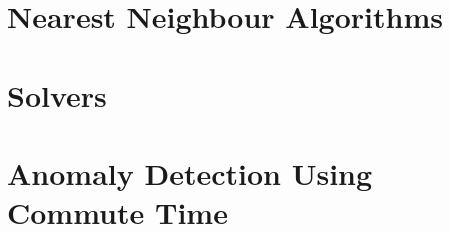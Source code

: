 \section{Nearest Neighbour Algorithms}
\label{nearestNeighbourAlgorithms}


\section{Solvers}
\label{solvers}


\section{Anomaly Detection Using Commute Time}
\label{anomalyDetection:commuteTime}

